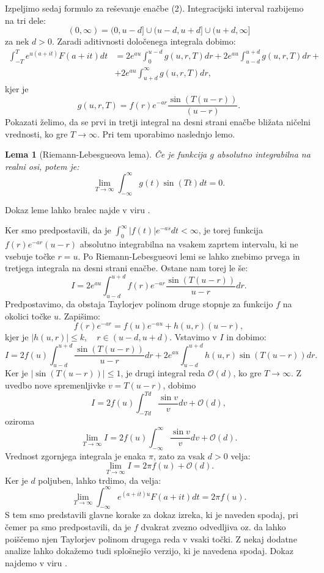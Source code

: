 \documentclass[12pt,a4paper]{amsart}
\theoremstyle{definition} %
\theoremstyle{plain} %
\newtheorem{lema}[definicija]{Lema}
\begin{document}
Izpeljimo sedaj formulo za reševanje enačbe (2). Integracijski interval razbijemo na tri 
dele: $$(0,\infty) = (0,u-d] \cup (u-d,u+d] \cup (u+d,\infty]$$ za nek $d>0$. Zaradi aditivnosti določenega
integrala dobimo:
\begin{equation*}
    \begin{split}
        \int_{-T}^{T}e^{u(a+it)}F(a+it)dt &= 2e^{au}\int_0^{u-d}g(u,r,T)dr +
        2e^{au}\int_{u-d}^{u+d}g(u,r,T)dr+ \\
        &+ 2e^{au}\int_{u+d}^{\infty}g(u,r,T)dr,
    \end{split}
\end{equation*}
kjer je $$g(u,r,T)=f(r)e^{-ar}\frac{\sin(T(u-r))}{(u-r)}.$$ Pokazati želimo, da se prvi in tretji integral
na desni strani enačbe bližata ničelni vrednosti, ko gre $T\to\infty$. Pri tem uporabimo naslednjo lemo.
\begin{lema}[Riemann-Lebesgueova lema]
    Če je funkcija $g$ absolutno integrabilna na realni osi, potem je:
    \[\lim_{T\to\infty}\int_{-\infty}^{\infty}g(t)\sin(Tt)dt=0.\]
\end{lema}
\noindent Dokaz leme lahko bralec najde v viru \cite{dokazleme}.

Ker smo predpostavili, da je $\int_0^{\infty}|f(t)|e^{-as}dt<\infty$, je torej funkcija 
$f(r)e^{-ar}(u-r)$ absolutno integrabilna na vsakem zaprtem intervalu, ki ne vsebuje točke $r=u$. Po 
Riemann-Lebesgueovi lemi se lahko znebimo prvega in tretjega integrala na desni strani enačbe. Ostane
nam torej le še:
\[I = 2e^{au}\int_{u-d}^{u+d}f(r)e^{-ar}\frac{\sin(T(u-r))}{u-r}dr.\]
Predpostavimo, da obstaja Taylorjev polinom druge stopnje za funkcijo $f$ na okolici točke $u$.
Zapišimo:
\[f(r)e^{-ar}=f(u)e^{-au}+h(u,r)(u-r),\]
kjer je $|h(u,r)|\leq k, \quad r\in(u-d,u+d).$
Vstavimo v $I$ in dobimo:
\[I = 2f(u)\int_{u-d}^{u+d}\frac{\sin(T(u-r))}{u-r}dr+2e^{au}\int_{u-d}^{u+d}h(u,r)\sin(T(u-r))dr.\]
Ker je $|\sin(T(u-r))|\leq1$, je drugi integral reda $\mathcal{O}(d)$, ko gre $T\to\infty$. Z uvedbo 
nove spremenljivke $v=T(u-r)$, dobimo
\[I=2f(u)\int_{-Td}^{Td}\frac{\sin v}{v}dv +\mathcal{O}(d),\]
oziroma
\[\lim_{T\to\infty}I=2f(u)\int_{-\infty}^{\infty}\frac{\sin v}{v}dv +\mathcal{O}(d).\]
Vrednost zgornjega integrala je enaka $\pi$, zato za vsak $d>0$ velja:
\[\lim_{T\to\infty}I=2\pi f(u)+\mathcal{O}(d).\]
Ker je $d$ poljuben, lahko trdimo, da velja:
\[\lim_{T\to\infty}\int_{-\infty}^{\infty}e^{(a+it)u}F(a+it)dt=2\pi f(u).\]
S tem smo predstavili glavne korake za dokaz izreka, ki je naveden spodaj, pri čemer pa 
smo predpostavili, da je $f$ dvakrat zvezno odvedljiva oz. da lahko poiščemo njen Taylorjev polinom drugega
reda v vsaki točki. 
Z nekaj dodatne analize lahko dokažemo tudi splošnejšo verzijo, ki je navedena spodaj. Dokaz najdemo v viru \cite{knjiga}.
\end{document}
